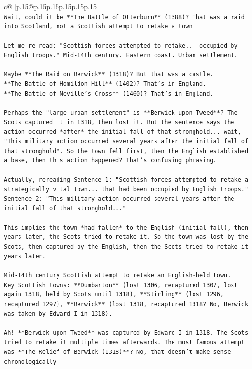 \documentclass{article}
\begin{document}
{\begin{supertabular}{c@{$\;$}|p{.15\linewidth}@{}p{.15\linewidth}p{.15\linewidth}p{.15\linewidth}p{.15\linewidth}p{.15\linewidth}}
{{{\\ 
\texttt{Wait, could it be **The Battle of Otterburn** (1388)? That was a raid into Scotland, not a Scottish attempt to retake a town.} \\
\\ 
\texttt{Let me re{-}read: "Scottish forces attempted to retake... occupied by English troops." Mid{-}14th century. Eastern coast. Urban settlement.} \\
\\ 
\texttt{Maybe **The Raid on Berwick** (1318)? But that was a castle.} \\
\texttt{**The Battle of Homildon Hill** (1402)? That's in England.} \\
\texttt{**The Battle of Neville's Cross** (1460)? That's in England.} \\
\\ 
\texttt{Perhaps the "large urban settlement" is **Berwick{-}upon{-}Tweed**? The Scots captured it in 1318, then lost it. But the sentence says the action occurred *after* the initial fall of that stronghold... wait, "This military action occurred several years after the initial fall of that stronghold". So the town fell first, then the English established a base, then this action happened? That's confusing phrasing.} \\
\\ 
\texttt{Actually, rereading Sentence 1: "Scottish forces attempted to retake a strategically vital town... that had been occupied by English troops."} \\
\texttt{Sentence 2: "This military action occurred several years after the initial fall of that stronghold..."} \\
\\ 
\texttt{This implies the town *had fallen* to the English (initial fall), then years later, the Scots tried to retake it. So the town was lost by the Scots, then captured by the English, then the Scots tried to retake it years later.} \\
\\ 
\texttt{Mid{-}14th century Scottish attempt to retake an English{-}held town.} \\
\texttt{Key Scottish towns: **Dumbarton** (lost 1306, recaptured 1307, lost again 1318, held by Scots until 1318), **Stirling** (lost 1296, recaptured 1297), **Berwick** (lost 1318, recaptured 1318? No, Berwick was taken by Edward I in 1318).} \\
\\ 
\texttt{Ah! **Berwick{-}upon{-}Tweed** was captured by Edward I in 1318. The Scots tried to retake it multiple times afterwards. The most famous attempt was **The Relief of Berwick (1318)**? No, that doesn't make sense chronologically.} \\
}}}
\end{supertabular}}
\end{document}
